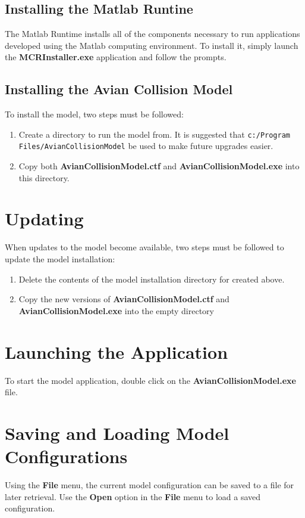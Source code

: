 \documentclass[11pt,letterpaper,openany]{report}
\begin{document}
\subsection{Installing the Matlab Runtine}
The Matlab Runtime installs all of the components necessary to run applications developed using the Matlab computing
environment. To install it, simply launch the \textbf{MCRInstaller.exe} application and follow the prompts.

\subsection{Installing the Avian Collision Model}
To install the model, two steps must be followed:
\begin{enumerate}
  \item Create a directory to run the model from. It is suggested that \newline
  \verb"c:/Program Files/AvianCollisionModel" \newline
  be used to make future upgrades easier.
  \item Copy both \textbf{AvianCollisionModel.ctf} and \textbf{AvianCollisionModel.exe} into this directory.
\end{enumerate}

\section{Updating}
When updates to the model become available, two steps must be followed to update the model installation:
\begin{enumerate}
  \item Delete the contents of the model installation directory for created above.
  \item Copy the new versions of \textbf{AvianCollisionModel.ctf} and \textbf{AvianCollisionModel.exe} into the
empty directory
\end{enumerate}

\section{Launching the Application}
To start the model application, double click on the \textbf{AvianCollisionModel.exe} file.

\section{Saving and Loading Model Configurations}
Using the \textbf{File} menu, the current model configuration can be saved to a file for later retrieval. Use the
\textbf{Open} option in the \textbf{File} menu to load a saved configuration.
\end{document}
